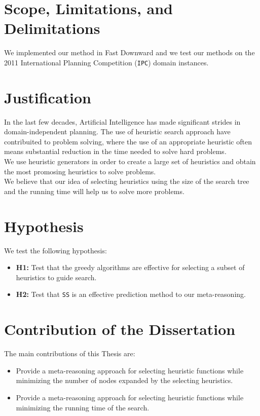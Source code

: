 \section{Scope, Limitations, and Delimitations}
\noindent
We implemented our method in Fast Downward \cite{helmert2006fast} and we test our methods on the 2011 International Planning Competition (\texttt{IPC}) domain instances.\\

\section{Justification}
\noindent
In the last few decades, Artificial Intelligence has made significant strides in domain-independent planning. The use of heuristic search approach have contribuited to problem solving, where the use of an appropriate heuristic often means substantial reduction in the time needed to solve hard problems.\\

We use heuristic generators in order to create a large set of heuristics and obtain the most promosing heuristics to solve problems.\\

We believe that our idea of selecting heuristics using the size of the search tree and the running time will help us to solve more problems.

\section{Hypothesis}
\noindent
We test the following hypothesis:
\begin{itemize}
\item \textbf{H1:} Test that the greedy algorithms are effective for selecting a subset of heuristics to guide search.

\item \textbf{H2:} Test that \texttt{SS} is an effective prediction method to our meta-reasoning.
\end{itemize}

\section{Contribution of the Dissertation}
\noindent
The main contributions of this Thesis are:
\begin{itemize}
\item Provide a meta-reasoning approach for selecting heuristic functions while minimizing the number of nodes expanded by the selecting heuristics.

\item Provide a meta-reasoning approach for selecting heuristic functions while minimizing the running time of the search. 
\end{itemize}

